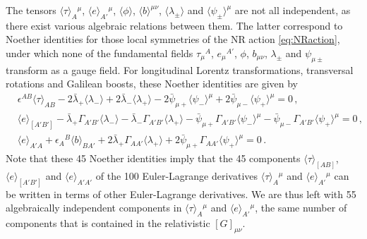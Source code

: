 \documentclass[a4paper,10pt,openany]{article}
\begin{document}
	The tensors $\langle \tau \rangle_A{}^\mu$, $\langle e \rangle_{A'}{}^\mu$, $\langle \phi \rangle$, $\langle b \rangle^{\mu\nu}$, $\langle \lambda_\pm \rangle$ and $\langle \psi_\pm \rangle^\mu$ are not all independent, as there exist various algebraic relations between them. The latter correspond to Noether identities for those local symmetries of the NR action \eqref{eq:NRaction}, under which none of the fundamental fields $\tau_\mu{}^A$, $e_\mu{}^{A'}$, $\phi$, $b_{\mu\nu}$, $\lambda_\pm$ and $\psi_{\mu \pm}$ transform as a gauge field. For longitudinal Lorentz transformations, transversal rotations and Galilean boosts, these Noether identities are given by
	\begin{subequations}   \label{eq:Noetherids1}
		\begin{align}
			& \epsilon^{AB} \langle \tau \rangle_{AB} - 2 \bar{\lambda}_+ \langle \lambda_- \rangle + 2 \bar{\lambda}_- \langle \lambda_+ \rangle - 2 \bar{\psi}_{\mu +} \langle \psi_- \rangle^\mu + 2 \bar{\psi}_{\mu -} \langle \psi_+ \rangle^\mu= 0 \,, \label{eq:NoetherSO11}  \\
			& \langle e \rangle_{[A'B']} - \bar{\lambda}_+ \Gamma_{A'B'} \langle \lambda_- \rangle - \bar{\lambda}_- \Gamma_{A'B'} \langle \lambda_+ \rangle - \bar{\psi}_{\mu +} \Gamma_{A'B'} \langle \psi_- \rangle^\mu - \bar{\psi}_{\mu -} \Gamma_{A'B'} \langle \psi_+ \rangle^\mu = 0 \,, \\
			& \langle e \rangle_{A'A} + \epsilon_{A}{}^B \langle b \rangle_{BA'} + 2 \bar{\lambda}_+ \Gamma_{AA'} \langle \lambda_+ \rangle + 2 \bar{\psi}_{\mu +} \Gamma_{A A'} \langle \psi_+ \rangle^\mu = 0 \,.
		\end{align}
	\end{subequations}
	Note that these 45 Noether identities imply that the 45 components $\langle \tau \rangle_{[AB]}$, $\langle e \rangle_{[A'B']}$ and $\langle e \rangle_{A'A'}$ of the 100 Euler-Lagrange derivatives $\langle \tau \rangle_A{}^\mu$ and $\langle e \rangle_{A'}{}^\mu$ can be written in terms of other Euler-Lagrange derivatives. We are thus left with 55 algebraically independent components in $\langle \tau \rangle_A{}^\mu$ and $\langle e \rangle_{A'}{}^\mu$, the same number of components that is contained in the relativistic $[G]_{\mu\nu}$.
	
\end{document}
